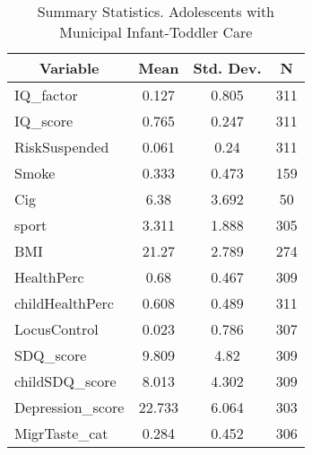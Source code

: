 
\begin{table}[htbp]\centering \caption{Summary Statistics. Adolescents with Municipal Infant-Toddler Care \label{schoolAdolasiloMuni}}
\begin{tabular}{l c c  c}\hline\hline
\multicolumn{1}{c}{\textbf{Variable}} & \textbf{Mean}
 & \textbf{Std. Dev.} & \textbf{N}\\ \hline
IQ\_factor & 0.127 & 0.805  & 311\\
IQ\_score & 0.765 & 0.247  & 311\\
RiskSuspended & 0.061 & 0.24  & 311\\
Smoke & 0.333 & 0.473  & 159\\
Cig & 6.38 & 3.692  & 50\\
sport & 3.311 & 1.888  & 305\\
BMI & 21.27 & 2.789  & 274\\
HealthPerc & 0.68 & 0.467  & 309\\
childHealthPerc & 0.608 & 0.489  & 311\\
LocusControl & 0.023 & 0.786  & 307\\
SDQ\_score & 9.809 & 4.82  & 309\\
childSDQ\_score & 8.013 & 4.302  & 309\\
Depression\_score & 22.733 & 6.064  & 303\\
MigrTaste\_cat & 0.284 & 0.452  & 306\\
\hline\end{tabular}
\end{table}
